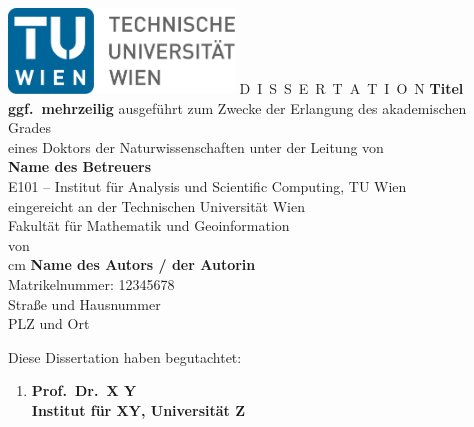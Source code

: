 

\begin{titlepage}
  \vspace*{-2cm}
  \begin{center}
    \includegraphics[width=0.45\textwidth]{figures/TULogo.pdf}
    \vskip 1cm
    {\LARGE D~\Large I~S~S~E~R~T~A~T~I~O~N}
    \vskip 8mm
    {\huge\bfseries\color{change}Titel \\[1ex] ggf.\ mehrzeilig}
    \vskip 1cm
    \large
    ausgef\"uhrt zum Zwecke der Erlangung des akademischen Grades\\[1ex]
    eines Doktors der Naturwissenschaften unter der Leitung von\\[1ex]
    \vskip 0.5cm
    {\Large\bfseries\color{change}Name des Betreuers}\\[1ex]
    E101 -- Institut f\"ur Analysis und Scientific Computing, TU Wien\\[1ex]
    \vskip 0.75cm
    eingereicht an der Technischen Universit\"at Wien\\[1ex]
    Fakult\"at f\"ur Mathematik und Geoinformation\\[1ex]
    \vskip 0.15cm
    von\\[1ex]
     cm
    {\Large\bfseries\color{change}Name des Autors / der Autorin}\\[1ex]
    Matrikelnummer: {\color{change}12345678}\\[1ex]
    {\color{change}Straße und Hausnummer}\\[1ex]
    {\color{change}PLZ und Ort}
  \end{center}

  \vskip 1cm

  Diese Dissertation haben begutachtet:
  \begin{enumerate}

    \item \bfseries\large{\color{change} Prof.\ Dr.\ X Y}\\
      \normalfont\small{\color{change} Institut für XY, Universität Z}


\end{enumerate}
\end{titlepage}
